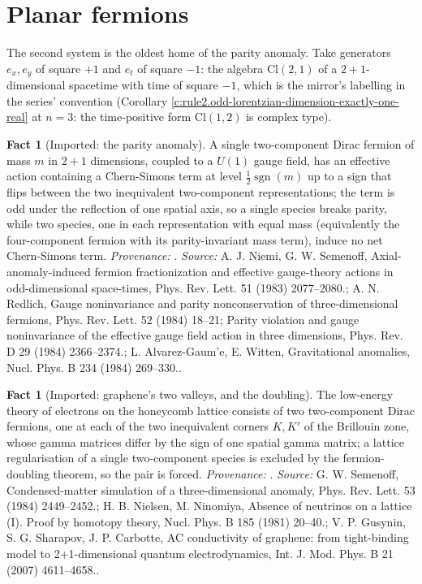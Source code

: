 \documentclass[11pt]{article}
\theoremstyle{definition}
\newtheorem{fact}[theorem]{Fact}
\theoremstyle{plain}
\providecommand{\Cl}{}\renewcommand{\Cl}{\mathrm{Cl}}
\providecommand{\sgn}{}\renewcommand{\sgn}{\operatorname{sgn}}
\begin{document}
\section{Planar fermions}

\label{c:note.rule2.setting-planar-fermions}
The second system is the oldest home of the parity anomaly. Take generators $e_x, e_y$ of square $+1$ and $e_t$ of square $-1$: the algebra $\Cl(2,1)$ of a $2{+}1$-dimensional spacetime with time of square $-1$, which is the mirror's labelling in the series' convention (Corollary \ref{c:rule2.odd-lorentzian-dimension-exactly-one-real} at $n = 3$: the time-positive form $\Cl(1,2)$ is complex type).

\begin{fact}[Imported: the parity anomaly]\label{c:rule2.imported-parity-anomaly}
A single two-component Dirac fermion of mass $m$ in $2{+}1$ dimensions, coupled to a $U(1)$ gauge field, has an effective action containing a Chern-Simons term at level $\tfrac12\sgn(m)$ up to a sign that flips between the two inequivalent two-component representations; the term is odd under the reflection of one spatial axis, so a single species breaks parity, while two species, one in each representation with equal mass (equivalently the four-component fermion with its parity-invariant mass term), induce no net Chern-Simons term. \emph{Provenance:} \cite{NiemiSemenoff1983, Redlich1984, AGW1984}.
\emph{Source:} A. J. Niemi, G. W. Semenoff, Axial-anomaly-induced fermion fractionization and effective gauge-theory actions in odd-dimensional space-times, Phys. Rev. Lett. 51 (1983) 2077--2080.; A. N. Redlich, Gauge noninvariance and parity nonconservation of three-dimensional fermions, Phys. Rev. Lett. 52 (1984) 18--21; Parity violation and gauge noninvariance of the effective gauge field action in three dimensions, Phys. Rev. D 29 (1984) 2366--2374.; L. Alvarez-Gaum'e, E. Witten, Gravitational anomalies, Nucl. Phys. B 234 (1984) 269--330..
\end{fact}

\begin{fact}[Imported: graphene's two valleys, and the doubling]\label{c:rule2.imported-graphenes-two-valleys-doubling}
The low-energy theory of electrons on the honeycomb lattice consists of two two-component Dirac fermions, one at each of the two inequivalent corners $K, K'$ of the Brillouin zone, whose gamma matrices differ by the sign of one spatial gamma matrix; a lattice regularisation of a single two-component species is excluded by the fermion-doubling theorem, so the pair is forced. \emph{Provenance:} \cite{Semenoff1984, NielsenNinomiya1981, GSC2007}.
\emph{Source:} G. W. Semenoff, Condensed-matter simulation of a three-dimensional anomaly, Phys. Rev. Lett. 53 (1984) 2449--2452.; H. B. Nielsen, M. Ninomiya, Absence of neutrinos on a lattice (I). Proof by homotopy theory, Nucl. Phys. B 185 (1981) 20--40.; V. P. Gusynin, S. G. Sharapov, J. P. Carbotte, AC conductivity of graphene: from tight-binding model to 2+1-dimensional quantum electrodynamics, Int. J. Mod. Phys. B 21 (2007) 4611--4658..
\end{fact}
\end{document}
